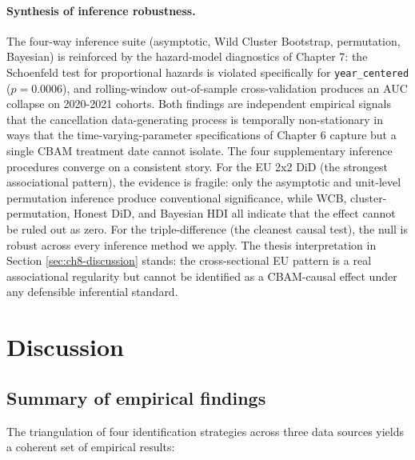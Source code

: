 \documentclass[11pt,a4paper]{article}
\begin{document}
\paragraph{Synthesis of inference robustness.} The four-way inference suite (asymptotic, Wild Cluster Bootstrap, permutation, Bayesian) is reinforced by the hazard-model diagnostics of Chapter 7: the Schoenfeld test for proportional hazards is violated specifically for \texttt{year\_centered} ($p = 0.0006$), and rolling-window out-of-sample cross-validation produces an AUC collapse on 2020-2021 cohorts. Both findings are independent empirical signals that the cancellation data-generating process is temporally non-stationary in ways that the time-varying-parameter specifications of Chapter 6 capture but a single CBAM treatment date cannot isolate. The four supplementary inference procedures converge on a consistent story. For the EU 2x2 DiD (the strongest associational pattern), the evidence is fragile: only the asymptotic and unit-level permutation inference produce conventional significance, while WCB, cluster-permutation, Honest DiD, and Bayesian HDI all indicate that the effect cannot be ruled out as zero. For the triple-difference (the cleanest causal test), the null is robust across every inference method we apply. The thesis interpretation in Section \ref{sec:ch8-discussion} stands: the cross-sectional EU pattern is a real associational regularity but cannot be identified as a CBAM-causal effect under any defensible inferential standard.


\section{Discussion}
\label{sec:ch8-discussion-implications}

\subsection{Summary of empirical findings}

The triangulation of four identification strategies across three data sources yields a coherent set of empirical results:
\end{document}
